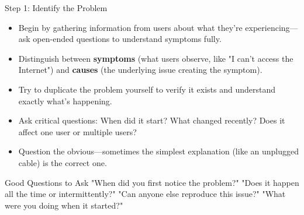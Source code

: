 \documentclass[aspectratio=169]{beamer}
\begin{document}
\begin{frame}{Step 1: Identify the Problem}

\begin{itemize}
    \item Begin by gathering information from users about what they're experiencing—ask open-ended questions to understand symptoms fully.
    \item Distinguish between \textbf{symptoms} (what users observe, like "I can't access the Internet") and \textbf{causes} (the underlying issue creating the symptom).
    \item Try to duplicate the problem yourself to verify it exists and understand exactly what's happening.
    \item Ask critical questions: When did it start? What changed recently? Does it affect one user or multiple users?
    \item Question the obvious—sometimes the simplest explanation (like an unplugged cable) is the correct one.
\end{itemize}

\vspace{0.3cm}

\begin{block}{Good Questions to Ask}
"When did you first notice the problem?" "Does it happen all the time or intermittently?" "Can anyone else reproduce this issue?" "What were you doing when it started?"
\end{block}

\end{frame}
\end{document}
